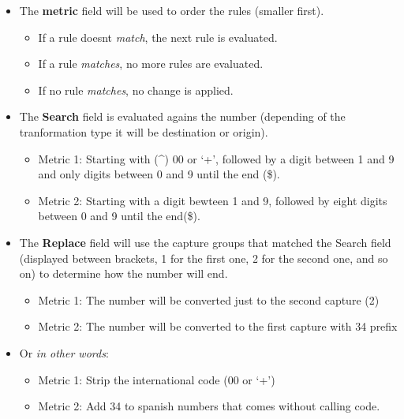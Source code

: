 \documentclass[letterpaper,10pt,english]{sphinxmanual}
\begin{document}
\noindent{}
\begin{itemize}
\item {} 
The \textbf{metric} field will be used to order the rules (smaller first).
\begin{itemize}
\item {} 
If a rule doesnt \emph{match}, the next rule is evaluated.

\item {} 
If a rule \emph{matches}, no more rules are evaluated.

\item {} 
If no rule \emph{matches}, no change is applied.

\end{itemize}

\item {} 
The \textbf{Search} field is evaluated agains the number (depending of the
tranformation type it will be destination or origin).
\begin{itemize}
\item {} 
Metric 1: Starting with (\textasciicircum{}) 00 or `+', followed by a digit between 1 and 9
and only digits between 0 and 9 until the end (\$).

\item {} 
Metric 2: Starting with a digit bewteen 1 and 9, followed by eight digits
between 0 and 9 until the end(\$).

\end{itemize}

\item {} 
The \textbf{Replace} field will use the capture groups that matched the Search
field (displayed between brackets, 1 for the first one, 2 for the second
one, and so on) to determine how the number will end.
\begin{itemize}
\item {} 
Metric 1: The number will be converted just to the second capture (2)

\item {} 
Metric 2: The number will be converted to the first capture with 34 prefix

\end{itemize}

\item {} 
Or \emph{in other words}:
\begin{itemize}
\item {} 
Metric 1: Strip the international code (00 or `+')

\item {} 
Metric 2: Add 34 to spanish numbers that comes without calling code.

\end{itemize}

\end{itemize}
\end{document}
